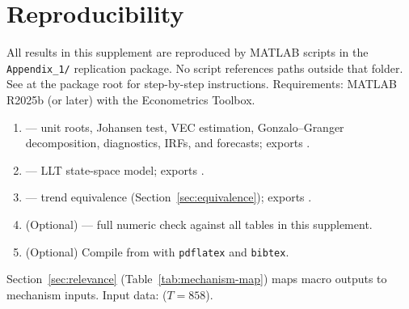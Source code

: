 \documentclass[ecta,nameyear,final,supplement]{econsocart}
\numberwithin{equation}{section}
\numberwithin{table}{section}
\theoremstyle{definition}
\begin{document}
\section{Reproducibility}
\label{sec:repro}

\begin{sloppypar}
All results in this supplement are reproduced by MATLAB scripts in the
\texttt{Appendix\_1/} replication package. No script references paths outside
that folder. See  at the package root for step-by-step
instructions. Requirements: MATLAB R2025b (or later) with the Econometrics
Toolbox.
\end{sloppypar}

\begin{enumerate}
\item {} --- unit roots, Johansen test, VEC
  estimation, Gonzalo--Granger decomposition, diagnostics, IRFs, and
  forecasts; exports .
\item {} --- LLT state-space model;
  exports .
\item {} --- trend
  equivalence (Section~\ref{sec:equivalence}); exports
  .
\item (Optional)  --- full
  numeric check against all tables in this supplement.
\item (Optional) Compile  from  with
  \texttt{pdflatex} and \texttt{bibtex}.
\end{enumerate}

\begin{sloppypar}
Section~\ref{sec:relevance} (Table~\ref{tab:mechanism-map}) maps macro outputs
to mechanism inputs. Input data:  ($T=858$).
\end{sloppypar}



\end{document}
